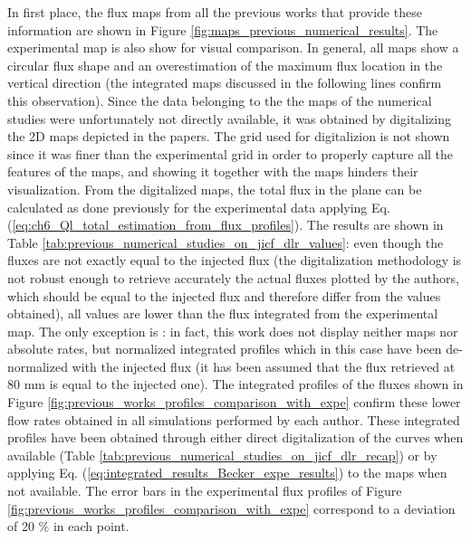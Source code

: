 In first place, the flux maps from all the previous works that provide these information are shown in Figure \ref{fig:maps_previous_numerical_results}. The experimental map is also show for visual comparison. In general, all maps show a circular flux shape and an overestimation of the maximum flux location in the vertical direction (the integrated maps discussed in the following lines confirm this observation). Since the data belonging to the the maps of the numerical studies were unfortunately not directly available, it was obtained by digitalizing the 2D maps depicted in the papers. The grid used for digitalizion is not shown since it was finer than the experimental grid in order to properly capture all the features of the maps, and showing it together with the maps hinders their visualization. From the digitalized maps, the total flux in the plane can be calculated as done previously for the experimental data applying Eq. (\ref{eq:ch6_Ql_total_estimation_from_flux_profiles}). The results are shown in Table \ref{tab:previous_numerical_studies_on_jicf_dlr_values}: even though the fluxes are not exactly equal to the injected flux (the digitalization methodology is not robust enough to retrieve accurately the actual fluxes plotted by the authors, which should be equal to the injected flux and therefore differ from the values obtained), all values are lower than the flux integrated from the experimental map. The only exception is : in fact, this work does not display neither maps nor absolute rates, but normalized integrated profiles which in this case have been de-normalized with the injected flux (it has been assumed that the flux retrieved at 80 mm is equal to the injected one). The integrated profiles of the fluxes shown in Figure \ref{fig:previous_works_profiles_comparison_with_expe} confirm these lower flow rates obtained in all simulations performed by each author. These integrated profiles have been obtained through either direct digitalization of the curves when available (Table \ref{tab:previous_numerical_studies_on_jicf_dlr_recap}) or by applying Eq. (\ref{eq:integrated_results_Becker_expe_results}) to the maps when not available. The error bars in the experimental flux profiles of Figure \ref{fig:previous_works_profiles_comparison_with_expe} correspond to a deviation of 20 $\%$ in each point. 


